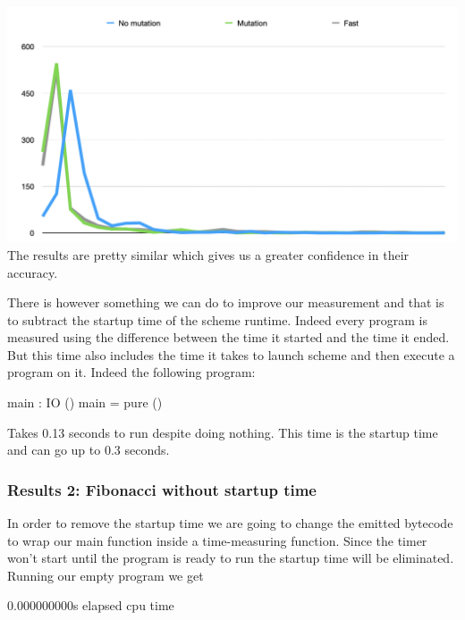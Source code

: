 \documentclass[
]{article}
\newenvironment{Shaded}{}{}
\newcommand{\DataTypeTok}[1]{\textcolor[rgb]{0.56,0.13,0.00}{#1}}
\newcommand{\FloatTok}[1]{\textcolor[rgb]{0.25,0.63,0.44}{#1}}
\newcommand{\FunctionTok}[1]{\textcolor[rgb]{0.02,0.16,0.49}{#1}}
\newcommand{\NormalTok}[1]{#1}
\newcommand{\OperatorTok}[1]{\textcolor[rgb]{0.40,0.40,0.40}{#1}}
\newcommand{\OtherTok}[1]{\textcolor[rgb]{0.00,0.44,0.13}{#1}}
\begin{document}
\includegraphics{Screenshot 2020-08-25 at 18.00.17.png} The results are
pretty similar which gives us a greater confidence in their accuracy.

There is however something we can do to improve our measurement and that
is to subtract the startup time of the scheme runtime. Indeed every
program is measured using the difference between the time it started and
the time it ended. But this time also includes the time it takes to
launch scheme and then execute a program on it. Indeed the following
program:

\begin{Shaded}
\begin{Highlighting}[]
\NormalTok{main }\OperatorTok{:} \DataTypeTok{IO}\NormalTok{ ()}
\NormalTok{main }\OtherTok{=} \FunctionTok{pure}\NormalTok{ ()}
\end{Highlighting}
\end{Shaded}

Takes 0.13 seconds to run despite doing nothing. This time is the
startup time and can go up to 0.3 seconds.

\hypertarget{results-2-fibonacci-without-startup-time}{%
\subsubsection{Results 2: Fibonacci without startup
time}\label{results-2-fibonacci-without-startup-time}}

In order to remove the startup time we are going to change the emitted
bytecode to wrap our main function inside a time-measuring function.
Since the timer won't start until the program is ready to run the
startup time will be eliminated. Running our empty program we get

\begin{Shaded}
\begin{Highlighting}[]
\FloatTok{0.000000000}\NormalTok{s elapsed cpu time}
\end{Highlighting}
\end{Shaded}
\end{document}
